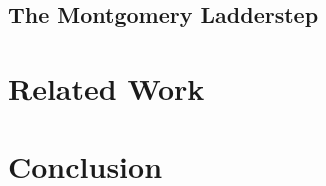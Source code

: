 \documentclass{llncs}
\begin{document}
\vspace{-.5em}
\subsection{The Montgomery Ladderstep}
\vspace{-.5em}
\label{subsection:evaluation:ladder-step}


\vspace{-.5em}
\section{Related Work}
\vspace{-.5em}
\label{section:related_work}


\vspace{-.5em}
\section{Conclusion}
\vspace{-.5em}
\label{section:conclusion}


\newpage



\end{document}
